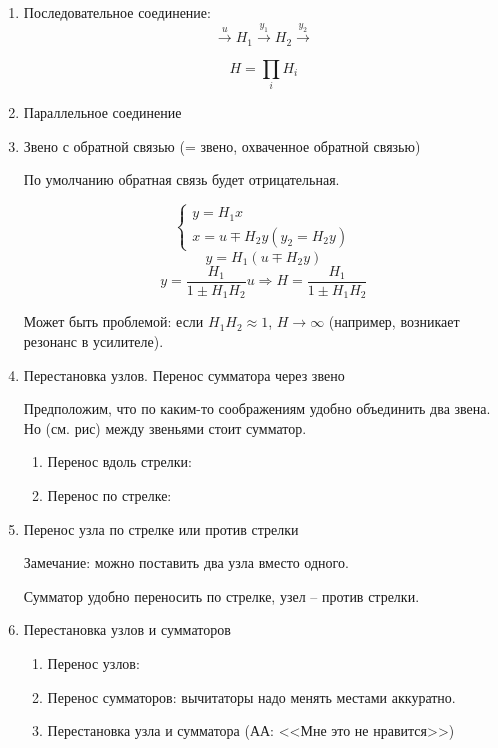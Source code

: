 \documentclass[main.tex]{subfiles}
\begin{document}
\begin{enumerate}[noitemsep]
    \item Последовательное соединение:
    $$ \xrightarrow{u}\boxed{H_1}\xrightarrow{y_1}\boxed{H_2}\xrightarrow{y_2} $$

    $$ \boxed{H = \prod_i H_i } $$
    \item Параллельное соединение

    \item Звено с обратной связью (= звено, охваченное обратной связью)

    По умолчанию обратная связь будет отрицательная.


    $$ \begin{cases}
        y = H_1x \\
        x = u \mp H_2 y (y_2 = H_2y)
    \end{cases} $$
    $$ y = H_1 (u \mp H_2 y) $$
    $$ y = \frac{H_1}{1 \pm H_1 H_2}u \Rightarrow H = \frac{H_1}{1 \pm H_1 H _2} $$

    Может быть проблемой: если $ H_1 H_2 \approx 1 $, $ H \to \infty $ (например, возникает резонанс в усилителе).

    \item Перестановка узлов. Перенос сумматора через звено

    Предположим, что по каким-то соображениям удобно объединить два звена.
    Но (см. рис) между звеньями стоит сумматор.

    \begin{enumerate}[noitemsep]
        \item Перенос вдоль стрелки:
        \item Перенос по стрелке:
    \end{enumerate}

    \item Перенос узла по стрелке или против стрелки


    Замечание: можно поставить два узла вместо одного.

    Сумматор удобно переносить по стрелке, узел -- против стрелки.

    \item Перестановка узлов и сумматоров

     \begin{enumerate}[noitemsep]
        \item Перенос узлов:
        \item Перенос сумматоров:
        вычитаторы надо менять местами аккуратно.

        \item Перестановка узла и сумматора (АА: <<Мне это не нравится>>)
    \end{enumerate}
\end{enumerate}
\end{document}
